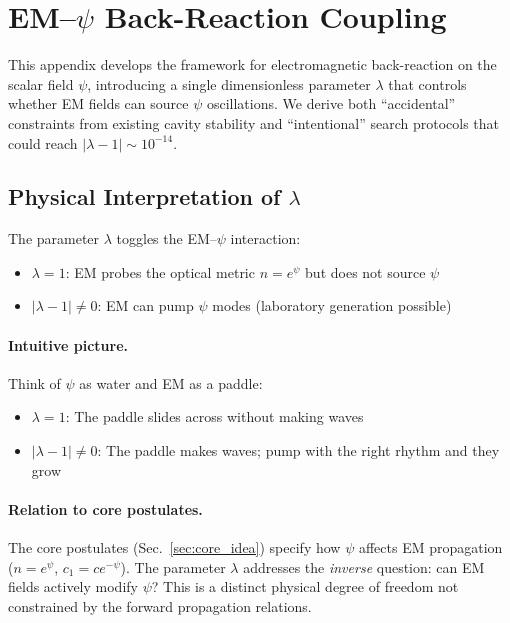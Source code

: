 
\section{EM--$\psi$ Back-Reaction Coupling}\label{app:em-psi-coupling}

This appendix develops the framework for electromagnetic back-reaction on 
the scalar field $\psi$, introducing a single dimensionless parameter $\lambda$ 
that controls whether EM fields can source $\psi$ oscillations. We derive 
both ``accidental'' constraints from existing cavity stability and 
``intentional'' search protocols that could reach $|\lambda - 1| \sim 10^{-14}$.

\subsection{Physical Interpretation of $\lambda$}\label{sec:lambda-physics}

The parameter $\lambda$ toggles the EM--$\psi$ interaction:
\begin{itemize}
\item $\lambda = 1$: EM probes the optical metric $n = e^\psi$ but does not source $\psi$
\item $|\lambda - 1| \neq 0$: EM can pump $\psi$ modes (laboratory generation possible)
\end{itemize}

\paragraph{Intuitive picture.}
Think of $\psi$ as water and EM as a paddle:
\begin{itemize}
\item $\lambda = 1$: The paddle slides across without making waves
\item $|\lambda - 1| \neq 0$: The paddle makes waves; pump with the right rhythm and they grow
\end{itemize}

\paragraph{Relation to core postulates.}
The core \DFD postulates (Sec.~\ref{sec:core_idea}) specify how $\psi$ 
affects EM propagation ($n = e^\psi$, $c_1 = ce^{-\psi}$). The parameter 
$\lambda$ addresses the \textit{inverse} question: can EM fields actively 
modify $\psi$? This is a distinct physical degree of freedom not constrained 
by the forward propagation relations.

